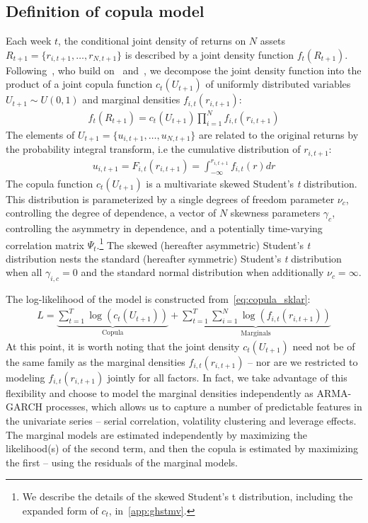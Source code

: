 
\subsection{Definition of copula model} %
\label{sub:definition_of_copula_model}

Each week $t$, the conditional joint density of returns on $N$ assets $R_{t+1} = \{r_{i,t+1},\ldots,r_{N,t+1}\}$ is described by a joint density function $f_t(R_{t+1})$. Following~\textcite{ChristoffersenErrunzaJacobLanglois2012}, who build on~\textcite{Patton2006} and~\textcite{Sklar1959}, we decompose the joint density function into the product of a joint copula function $c_t(U_{t+1})$ of uniformly distributed variables $U_{t+1} \sim U(0, 1)$ and marginal densities $f_{i,t}(r_{i,t+1})$:
\begin{align}
  f_t(R_{t+1}) =
    c_t(U_{t+1}) \prod^N_{i=1} f_{i,t}(r_{i,t+1})
  \label{eq:copula_sklar}
\end{align}
The elements of $U_{t+1} = \{u_{i,t+1},\ldots,u_{N,t+1}\}$ are related to the original returns by the probability integral transform, i.e the cumulative distribution of $r_{i,t+1}$:
\begin{align}
  u_{i,t+1} = F_{i,t}(r_{i,t+1}) = \int_{-\infty}^{r_{i,t+1}} f_{i,t}(r)dr
\end{align}
The copula function $c_t(U_{t+1})$ is a multivariate skewed Student's \emph{t} distribution. This distribution is parameterized by a single degrees of freedom parameter $\nu_c$, controlling the degree of dependence, a vector of $N$ skewness parameters $\gamma_c$, controlling the asymmetry in dependence, and a potentially time-varying correlation matrix $\Psi_{t}$.\footnote{We describe the details of the skewed Student's t distribution, including the expanded form of $c_t$, in~\autoref{app:ghstmv}.} The skewed (hereafter asymmetric) Student's \emph{t} distribution nests the standard (hereafter symmetric) Student's \emph{t} distribution when all $\gamma_{i,c} = 0$ and the standard normal distribution when additionally $\nu_c = \infty$.

The log-likelihood of the model is constructed from~\autoref{eq:copula_sklar}:
\begin{align}
  L =
    \underbrace{\sum_{t=1}^T \log(c_t(U_{t+1}))}_\text{Copula} +
    \underbrace{\sum_{t=1}^T \sum_{i=1}^N \log(f_{i,t}(r_{i,t+1}))}_\text{Marginals}
\end{align}
At this point, it is worth noting that the joint density $c_t(U_{t+1})$ need not be of the same family as the marginal densities $f_{i,t}(r_{i,t+1})$ -- nor are we restricted to modeling $f_{i,t}(r_{i,t+1})$ jointly for all factors. In fact, we take advantage of this flexibility and choose to model the marginal densities independently as ARMA-GARCH processes, which allows us to capture a number of predictable features in the univariate series -- serial correlation, volatility clustering and leverage effects. The marginal models are estimated independently by maximizing the likelihood(s) of the second term, and then the copula is estimated by maximizing the first -- using the residuals of the marginal models.

